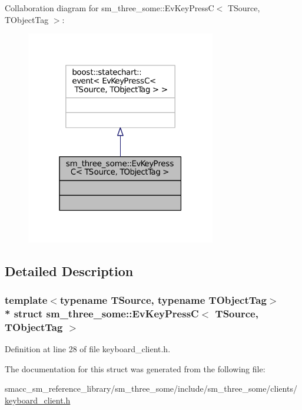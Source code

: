 Collaboration diagram for sm\+\_\+three\+\_\+some\+:\+:Ev\+Key\+PressC$<$ T\+Source, T\+Object\+Tag $>$\+:
\nopagebreak
\begin{figure}[H]
\begin{center}
\leavevmode
\includegraphics[width=235pt]{structsm__three__some_1_1EvKeyPressC__coll__graph}
\end{center}
\end{figure}


\subsection{Detailed Description}
\subsubsection*{template$<$typename T\+Source, typename T\+Object\+Tag$>$\\*
struct sm\+\_\+three\+\_\+some\+::\+Ev\+Key\+Press\+C$<$ T\+Source, T\+Object\+Tag $>$}



Definition at line 28 of file keyboard\+\_\+client.\+h.



The documentation for this struct was generated from the following file\+:\begin{DoxyCompactItemize}
\item 
smacc\+\_\+sm\+\_\+reference\+\_\+library/sm\+\_\+three\+\_\+some/include/sm\+\_\+three\+\_\+some/clients/\hyperlink{keyboard__client_8h}{keyboard\+\_\+client.\+h}\end{DoxyCompactItemize}
